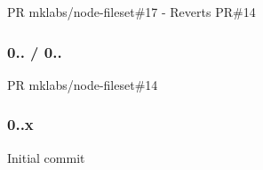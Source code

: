 \begin{DoxyItemize}
\item PR mklabs/node-\/fileset\#17 -\/ Reverts PR\#14
\end{DoxyItemize}

\subsubsection*{0.. / 0..}


\begin{DoxyItemize}
\item PR mklabs/node-\/fileset\#14
\end{DoxyItemize}

\subsubsection*{0..\+x}


\begin{DoxyItemize}
\item Initial commit 
\end{DoxyItemize}